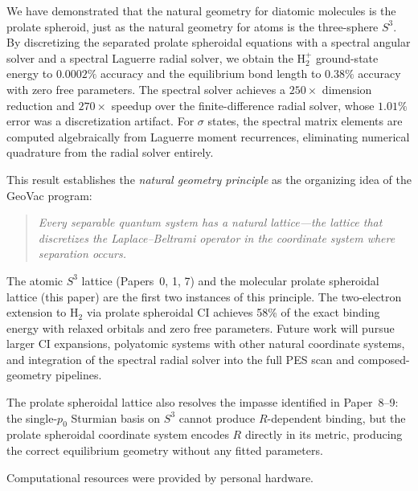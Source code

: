 \documentclass[aps,pra,twocolumn,superscriptaddress,longbibliography]{revtex4-2}
\begin{document}
We have demonstrated that the natural geometry for diatomic molecules
is the prolate spheroid, just as the natural geometry for atoms is
the three-sphere $S^3$.  By discretizing the separated prolate
spheroidal equations with a spectral angular solver and a spectral
Laguerre radial solver, we obtain the H$_2^+$ ground-state
energy to $0.0002\%$ accuracy and the equilibrium bond length to
$0.38\%$ accuracy with zero free parameters.  The spectral solver
achieves a $250\times$ dimension reduction and $270\times$ speedup
over the finite-difference radial solver, whose $1.01\%$ error was
a discretization artifact.  For $\sigma$ states, the spectral matrix
elements are computed algebraically from Laguerre moment recurrences,
eliminating numerical quadrature from the radial solver entirely.

This result establishes the \emph{natural geometry principle} as
the organizing idea of the GeoVac program:
\begin{quote}
\emph{Every separable quantum system has a natural lattice---the
lattice that discretizes the Laplace--Beltrami operator in the
coordinate system where separation occurs.}
\end{quote}
The atomic $S^3$ lattice (Papers~0, 1, 7) and the molecular prolate
spheroidal lattice (this paper) are the first two instances of this
principle.  The two-electron extension to H$_2$ via prolate
spheroidal CI achieves 58\% of the exact binding energy with relaxed
orbitals and zero free parameters.  Future work will pursue larger
CI expansions, polyatomic systems with other natural coordinate
systems, and integration of the spectral radial solver into the
full PES scan and composed-geometry pipelines.

The prolate spheroidal lattice also resolves the impasse identified
in Paper~8--9: the single-$p_0$ Sturmian basis on $S^3$ cannot
produce $R$-dependent binding, but the prolate spheroidal coordinate
system encodes $R$ directly in its metric, producing the correct
equilibrium geometry without any fitted parameters.


\begin{acknowledgments}
Computational resources were provided by personal hardware.
\end{acknowledgments}

\end{document}
